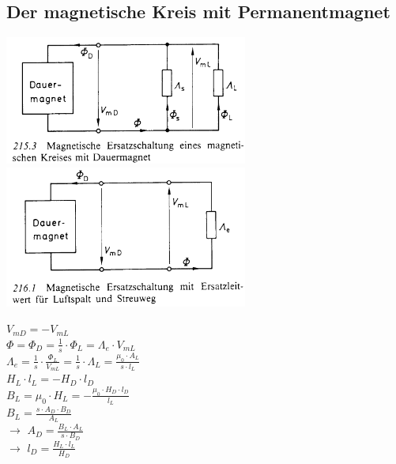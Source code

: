 \subsection{Der magnetische Kreis mit Permanentmagnet}
\begin{minipage}{8cm}
	\includegraphics[width=8cm]{./bilder/DauerMag_Schaltung.png} \\
	\includegraphics[width=8cm]{./bilder/DauerMag_Ersatzschaltung.png}
\end{minipage}
\hfill
\begin{minipage}{5cm}
	$V_{mD} = -V_{mL}$ \\
	
	$\Phi = \Phi_D = \frac{1}{s} \cdot \Phi_L = \Lambda_e \cdot V_{mL}$ \\
	
	$\Lambda_e = \frac{1}{s} \cdot \frac{\Phi_L}{V_{mL}} = \frac{1}{s} \cdot \Lambda_L = \frac{\mu_0 \cdot A_L}{s \cdot l_L}$ \\
	
	$H_L \cdot l_L = - H_D \cdot l_D$ \\
	
	$B_L = \mu_0 \cdot H_L = -\frac{\mu_0 \cdot H_D \cdot l_D}{l_L}$ \\
	
	$B_L = \frac{s \cdot A_D \cdot B_D}{A_L}$ \\
	
	$\rightarrow$ $\boxed{A_D = \frac{B_L \cdot A_L}{s \cdot B_D}}$ \\
	
	$\rightarrow$ $\boxed{l_D = \frac{H_L \cdot l_L}{H_D}}$	
	
\end{minipage}
